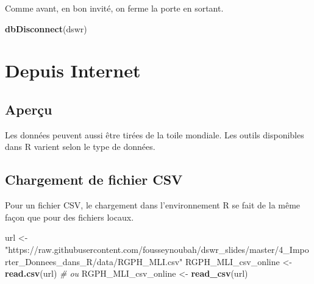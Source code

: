 \documentclass[]{book}
\newenvironment{Shaded}{\begin{snugshade}}{\end{snugshade}}
\newcommand{\KeywordTok}[1]{\textcolor[rgb]{0.13,0.29,0.53}{\textbf{#1}}}
\newcommand{\StringTok}[1]{\textcolor[rgb]{0.31,0.60,0.02}{#1}}
\newcommand{\CommentTok}[1]{\textcolor[rgb]{0.56,0.35,0.01}{\textit{#1}}}
\newcommand{\NormalTok}[1]{#1}
\begin{document}
Comme avant, en bon invité, on ferme la porte en sortant.

\begin{Shaded}
\begin{Highlighting}[]
\KeywordTok{dbDisconnect}\NormalTok{(dswr)}
\end{Highlighting}
\end{Shaded}

\section{Depuis Internet}\label{depuis-internet}

\subsection{Aperçu}\label{apercu-5}

Les données peuvent aussi être tirées de la toile mondiale. Les outils
disponibles dans R varient selon le type de données.

\subsection{Chargement de fichier CSV}\label{chargement-de-fichier-csv}

Pour un fichier CSV, le chargement dans l'environnement R se fait de la
même façon que pour des fichiers locaux.

\begin{Shaded}
\begin{Highlighting}[]
\NormalTok{url <-}\StringTok{ "https://raw.githubusercontent.com/fousseynoubah/dswr_slides/master/4_Importer_Donnees_dans_R/data/RGPH_MLI.csv"}
\NormalTok{RGPH_MLI_csv_online <-}\StringTok{ }\KeywordTok{read.csv}\NormalTok{(url)}
\CommentTok{# ou}
\NormalTok{RGPH_MLI_csv_online <-}\StringTok{ }\KeywordTok{read_csv}\NormalTok{(url)}
\end{Highlighting}
\end{Shaded}


\end{document}
